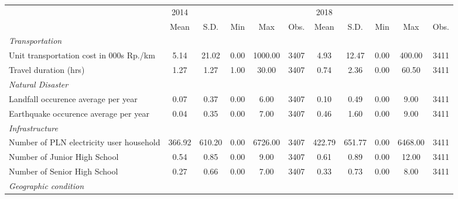 \begin{tabular}{l*{2}{ccccc}}
\toprule
                &     2014&         &         &         &         &     2018&         &         &         &         \\
                &     Mean&     S.D.&      Min&      Max&     Obs.&     Mean&     S.D.&      Min&      Max&     Obs.\\
\midrule
\emph{Transportation}&         &         &         &         &         &         &         &         &         &         \\
\hspace{0.25cm} Unit transportation cost in 000s Rp./km&     5.14&    21.02&     0.00&  1000.00&     3407&     4.93&    12.47&     0.00&   400.00&     3411\\
\hspace{0.25cm} Travel duration (hrs)&     1.27&     1.27&     1.00&    30.00&     3407&     0.74&     2.36&     0.00&    60.50&     3411\\
\emph{Natural Disaster}&         &         &         &         &         &         &         &         &         &         \\
\hspace{0.25cm} Landfall occurence average per year&     0.07&     0.37&     0.00&     6.00&     3407&     0.10&     0.49&     0.00&     9.00&     3411\\
\hspace{0.25cm} Earthquake occurence average per year&     0.04&     0.35&     0.00&     7.00&     3407&     0.46&     1.60&     0.00&     9.00&     3411\\
\emph{Infrastructure}&         &         &         &         &         &         &         &         &         &         \\
\hspace{0.25cm} Number of PLN electricity user household&   366.92&   610.20&     0.00&  6726.00&     3407&   422.79&   651.77&     0.00&  6468.00&     3411\\
\hspace{0.25cm} Number of Junior High School&     0.54&     0.85&     0.00&     9.00&     3407&     0.61&     0.89&     0.00&    12.00&     3411\\
\hspace{0.25cm} Number of Senior High School&     0.27&     0.66&     0.00&     7.00&     3407&     0.33&     0.73&     0.00&     8.00&     3411\\
\emph{Geographic condition}&         &         &         &         &         &         &         &         &         &         \\

\end{tabular}
